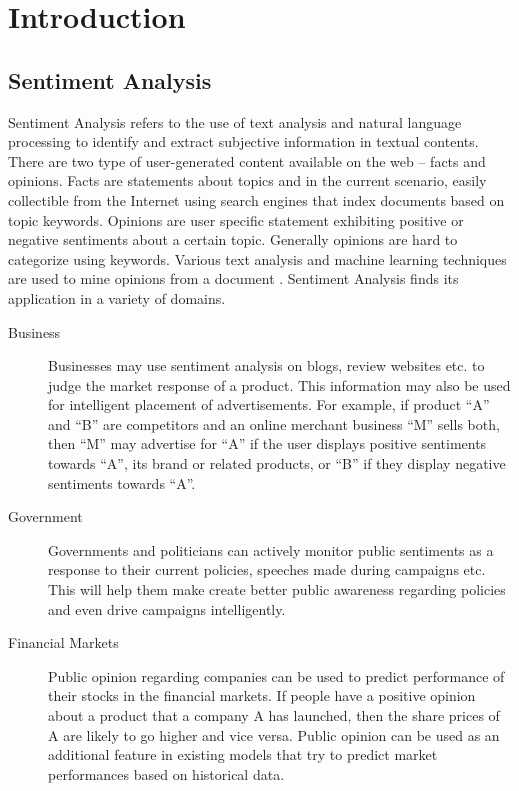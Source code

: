 \section{Introduction}

\subsection{Sentiment Analysis} Sentiment Analysis refers to the use of text
analysis and natural language processing to identify and extract subjective
information in textual contents. There are two type of user-generated content
available on the web – facts and opinions. Facts are statements about topics and
in the current scenario, easily collectible from the Internet using search
engines that index documents based on topic keywords. Opinions are user specific
statement exhibiting positive or negative sentiments about a certain topic.
Generally opinions are hard to categorize using keywords. Various text analysis
and machine learning techniques are used to mine opinions from a document
\cite{survey}. Sentiment Analysis finds its application in a variety of domains.

\begin{description}

\item[Business]{ Businesses may use sentiment analysis on blogs, review websites
etc. to judge the market response of a product. This information may also be
used for intelligent placement of advertisements. For example, if product ``A'' and
``B'' are competitors and an online merchant business ``M'' sells both, then ``M'' may
advertise for ``A'' if the user displays positive sentiments towards ``A'', its brand or
related products, or ``B'' if they display negative sentiments towards ``A''. }

\item[Government]{ Governments and politicians can actively monitor public
sentiments as a response to their current policies, speeches made during
campaigns etc. This will help them make create better public awareness regarding
policies and even drive campaigns intelligently. }

\item[Financial Markets]{ Public opinion regarding companies can be used to
predict performance of their stocks in the financial markets. If people have a
positive opinion about a product that a company A has launched, then the share
prices of A are likely to go higher and vice versa. Public opinion can be used
as an additional feature in existing models that try to predict market
performances based on historical data. }

\end{description}

